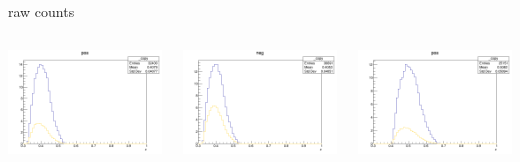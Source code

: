 \begin{frame}{raw counts}
\begin{columns}
\begin{column}[T]{0.25\textwidth}
\includegraphics[width = \textwidth]{results/yield/statistics/yield_x_Q2_z_0.55_4.764_0.40_pos.png}
\end{column}
\begin{column}[T]{0.25\textwidth}
\includegraphics[width = \textwidth]{results/yield/statistics/yield_x_Q2_z_0.55_4.764_0.40_neg.png}
\end{column}
\begin{column}[T]{0.25\textwidth}
\includegraphics[width = \textwidth]{results/yield/statistics/yield_x_Q2_z_0.55_4.764_0.50_pos.png}

\end{column}
\end{columns}
\end{frame}
